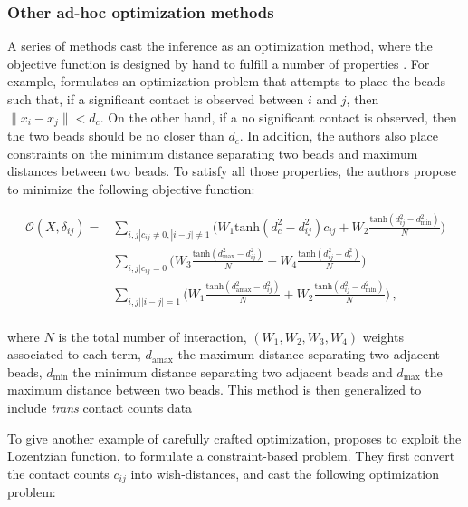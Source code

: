 \documentclass[letterpaper,12pt]{article}
\begin{document}
\subsubsection*{Other ad-hoc optimization methods}

A series of methods cast the inference as an optimization method, where the
objective function is designed by hand to fulfill a number of properties
\citep{trieu:large, trieu:MOGEN, trieu:3D}. For example, \citep{trieu:large}
formulates an optimization problem that attempts to place the beads such that,
if a significant contact is observed between $i$ and $j$, then $\| x_i - x_j
\| < d_c$. On the other hand, if a no significant contact is observed, then
the two beads should be no closer than $d_c$. In addition, the authors also
place constraints on the minimum distance separating two beads and maximum
distances between two beads. To satisfy all those properties, the authors
propose to minimize the following objective function:

\begin{equation*}
\begin{aligned}
\mathcal{O}(X, \delta_{ij}) = & \underset{i, j | c_{ij} \neq 0, |i-j| \neq 1}{\sum} \Bigg(W_1 \text{tanh}(d^2_c -
d^2_{ij}) c_{ij} + W_2 \frac{\text{tanh}(d^2_{ij} - d^2_\text{min})}{N} \Bigg) \\
& \underset{i, j | c_{ij} = 0}{\sum} \Bigg(W_3 \frac{\text{tanh}(d^2_\text{max} -
d^2_{ij})}{N} + W_4 \frac{\text{tanh}(d^2_{ij} -
d^2_{c})}{N}\Bigg) \\
& \underset{i, j | |i - j| = 1}{\sum} \Bigg(W_1 \frac{\text{tanh}(d^2_\text{amax} -
d^2_{ij})}{N} + W_2 \frac{\text{tanh}(d^2_{ij} -
d^2_\text{min})}{N}\Bigg) \,,\\
\end{aligned}
\end{equation*}

where $N$ is the total number of interaction, $(W_1, W_2, W_3, W_4)$ weights
associated to each term, $d_\text{amax}$ the maximum distance separating two
adjacent beads, $d_\text{min}$ the minimum distance separating two adjacent
beads and $d_\text{max}$ the maximum distance between two beads. 
This method is then generalized to include \textit{trans} contact counts data
\citep{trieu:MOGEN}

To give another example of carefully crafted optimization, \cite{trieu:3D}
proposes to exploit the Lozentzian function, to formulate a constraint-based
problem. They first convert the contact counts $c_{ij}$ into wish-distances,
and cast the following optimization problem:
\end{document}
